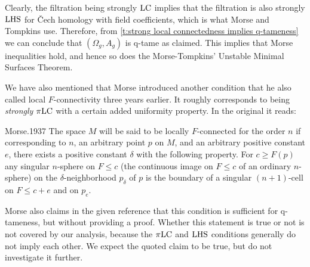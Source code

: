 Clearly, the filtration being strongly $\mathrm{LC}$ implies that the filtration is also strongly $\mathrm{LHS}$ for \v{C}ech homology with field coefficients, which is what Morse and Tompkins use.
Therefore, from \cref{t:strong local connectedness implies q-tameness} we can conclude that $(\Omega_g, A_g)$ is \mbox{q-tame} as claimed.
This implies that Morse inequalities hold, and hence so does the Morse-Tompkins' Unstable Minimal Surfaces Theorem.

We have also mentioned that Morse introduced another condition that he also called local $F$-connectivity three years earlier.
It roughly corresponds to being \emph{strongly} $\pi\mathrm{LC}$ with a certain added uniformity property.
In the original it reads:
\begin{displaycquote}[p.421-422]{Morse.1937}
	The space $M$ will be said to be locally $F$-connected for the order $n$ if corresponding to $n$, an arbitrary point $p$ on $M$, and an arbitrary positive constant $e$, there exists a positive constant $\delta$ with the following property.
	For $c \geq F(p)$ any singular $n$-sphere on $F \leq c$ (the continuous image on $F \leq c$ of an ordinary $n$-sphere) on the $\delta$-neighborhood $p_{\delta}$ of $p$ is the boundary of a singular $(n + 1)$-cell on $F \leq c + e$ and on $p_e$.
\end{displaycquote}
Morse also claims in the given reference that this condition is sufficient for q-tameness, but without providing a proof.
Whether this statement is true or not is not covered by our analysis, because the $\pi\mathrm{LC}$ and $\mathrm{LHS}$ conditions generally do not imply each other.
We expect the quoted claim to be true, but do not investigate it further.

